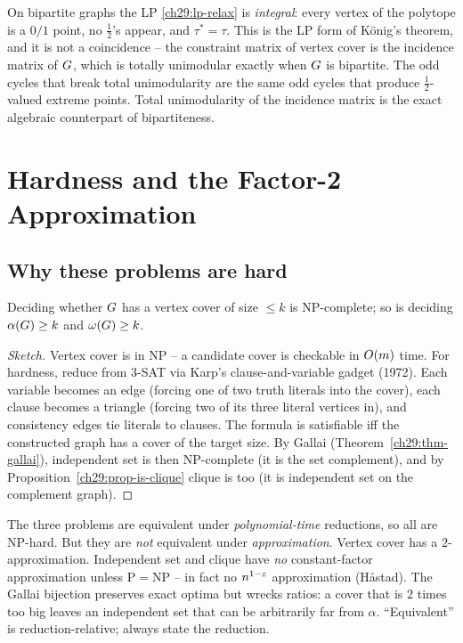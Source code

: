 \begin{connectionbox}
On bipartite graphs the LP \eqref{ch29:lp-relax} is \emph{integral}: every vertex
of the polytope is a $0/1$ point, no $\tfrac12$'s appear, and $\tau^*=\tau$. This
is the LP form of K\"onig's theorem, and it is not a coincidence -- the constraint
matrix of vertex cover is the incidence matrix of $G$, which is totally
unimodular exactly when $G$ is bipartite. The odd cycles that break total
unimodularity are the same odd cycles that produce $\tfrac12$-valued extreme points. Total unimodularity
of the incidence matrix is the exact algebraic counterpart of bipartiteness.
\end{connectionbox}

\section{Hardness and the Factor-2 Approximation}
\label{ch29:hardness}

\subsection{Why these problems are hard}

\begin{theorem}[NP-completeness]
\label{ch29:thm-nphard}
Deciding whether $G$ has a vertex cover of size $\le k$ is NP-complete; so is
deciding $\alpha(G)\ge k$ and $\omega(G)\ge k$.
\end{theorem}

\begin{proof}[Sketch]
Vertex cover is in NP -- a candidate cover is checkable in $O(m)$ time. For hardness, reduce from $3$-SAT via Karp's clause-and-variable gadget (1972).
Each variable becomes an edge (forcing one of two truth literals into the cover),
each clause becomes a triangle (forcing two of its three literal vertices in),
and consistency edges tie literals to clauses. The formula is satisfiable iff the
constructed graph has a cover of the target size. By Gallai
(Theorem~\ref{ch29:thm-gallai}), independent set is then NP-complete (it is the
set complement), and by Proposition~\ref{ch29:prop-is-clique} clique is too (it
is independent set on the complement graph).
\end{proof}

\begin{trapbox}
The three problems are equivalent under \emph{polynomial-time} reductions, so all
are NP-hard. But they are \emph{not} equivalent under \emph{approximation}.
Vertex cover has a $2$-approximation. Independent set and clique have
\emph{no} constant-factor approximation unless P${}={}$NP -- in fact no
$n^{1-\varepsilon}$ approximation (H{\aa}stad). The Gallai bijection preserves exact
optima but wrecks ratios: a cover that is $2$ times too big leaves an independent
set that can be arbitrarily far from $\alpha$. ``Equivalent'' is
reduction-relative; always state the reduction.
\end{trapbox}

